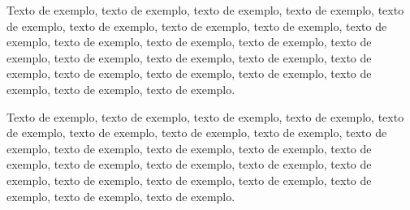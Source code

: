 \documentclass[
	12pt,				%
	oneside,			%
	a4paper,			%
	english,			%
	brazil				%
	]{abntex2ppgsi}
\begin{document}
Texto de exemplo, texto de exemplo, texto de exemplo, texto de exemplo, texto de exemplo, texto de exemplo, texto de exemplo, texto de exemplo, texto de exemplo, texto de exemplo, texto de exemplo, texto de exemplo, texto de exemplo, texto de exemplo, texto de exemplo, texto de exemplo, texto de exemplo, texto de exemplo, texto de exemplo, texto de exemplo, texto de exemplo, texto de exemplo, texto de exemplo.

Texto de exemplo, texto de exemplo, texto de exemplo, texto de exemplo, texto de exemplo, texto de exemplo, texto de exemplo, texto de exemplo, texto de exemplo, texto de exemplo, texto de exemplo, texto de exemplo, texto de exemplo, texto de exemplo, texto de exemplo, texto de exemplo, texto de exemplo, texto de exemplo, texto de exemplo, texto de exemplo, texto de exemplo, texto de exemplo, texto de exemplo.

\postextual



%
%

\end{document}
